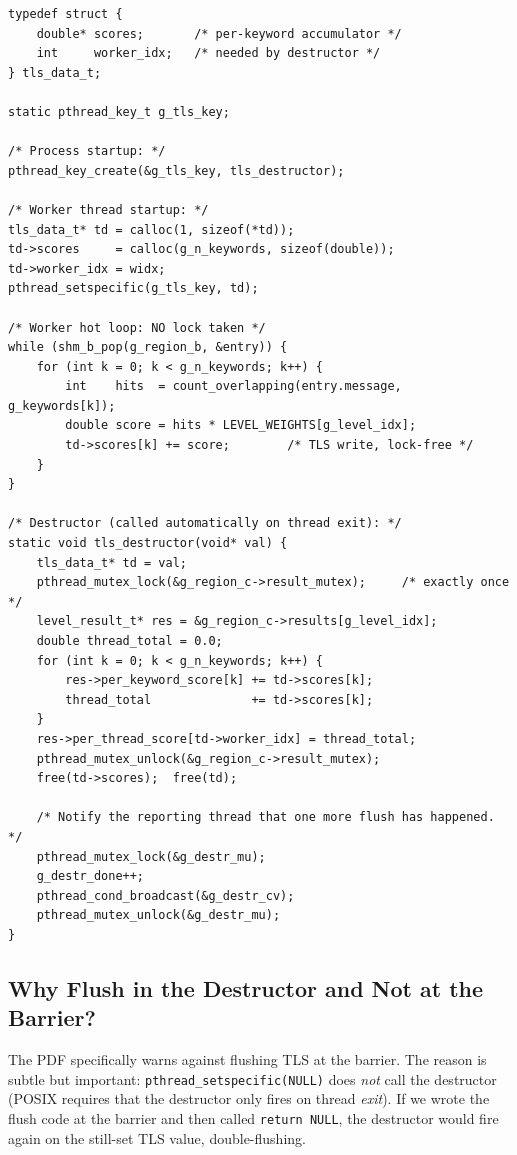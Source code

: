 \documentclass[11pt,a4paper]{article}
\newcommand{\code}[1]{\texttt{\small #1}}
\newcommand{\fname}[1]{\textit{\small #1}}
\begin{document}
\begin{lstlisting}[style=Cstyle, caption={TLS lifecycle in \fname{analyzer.c}.}]
typedef struct {
    double* scores;       /* per-keyword accumulator */
    int     worker_idx;   /* needed by destructor */
} tls_data_t;

static pthread_key_t g_tls_key;

/* Process startup: */
pthread_key_create(&g_tls_key, tls_destructor);

/* Worker thread startup: */
tls_data_t* td = calloc(1, sizeof(*td));
td->scores     = calloc(g_n_keywords, sizeof(double));
td->worker_idx = widx;
pthread_setspecific(g_tls_key, td);

/* Worker hot loop: NO lock taken */
while (shm_b_pop(g_region_b, &entry)) {
    for (int k = 0; k < g_n_keywords; k++) {
        int    hits  = count_overlapping(entry.message, g_keywords[k]);
        double score = hits * LEVEL_WEIGHTS[g_level_idx];
        td->scores[k] += score;        /* TLS write, lock-free */
    }
}

/* Destructor (called automatically on thread exit): */
static void tls_destructor(void* val) {
    tls_data_t* td = val;
    pthread_mutex_lock(&g_region_c->result_mutex);     /* exactly once */
    level_result_t* res = &g_region_c->results[g_level_idx];
    double thread_total = 0.0;
    for (int k = 0; k < g_n_keywords; k++) {
        res->per_keyword_score[k] += td->scores[k];
        thread_total              += td->scores[k];
    }
    res->per_thread_score[td->worker_idx] = thread_total;
    pthread_mutex_unlock(&g_region_c->result_mutex);
    free(td->scores);  free(td);

    /* Notify the reporting thread that one more flush has happened. */
    pthread_mutex_lock(&g_destr_mu);
    g_destr_done++;
    pthread_cond_broadcast(&g_destr_cv);
    pthread_mutex_unlock(&g_destr_mu);
}
\end{lstlisting}

\subsection{Why Flush in the Destructor and Not at the Barrier?}

The PDF specifically warns against flushing TLS at the barrier. The
reason is subtle but important: \code{pthread\_setspecific(NULL)} does
\emph{not} call the destructor (POSIX requires that the destructor only
fires on thread \emph{exit}). If we wrote the flush code at the barrier
and then called \code{return NULL}, the destructor would fire again on
the still-set TLS value, double-flushing.
\end{document}
